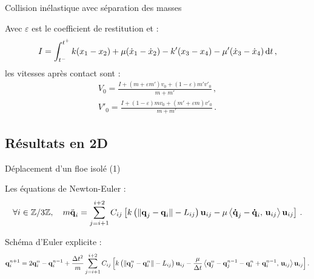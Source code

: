 \begin{frame}{Collision inélastique avec séparation des masses}
{{            Avec $\varepsilon$ est le coefficient de restitution et :
            \scriptsize
            $$
            I = \int_{t^{-}}^{t^{+}} k(x_1 - x_2) + \mu (\dot x_1 - \dot x_2) - k'(x_3 - x_4) - \mu'(\dot x_3 - \dot x_4) \mathop{}\!\mathrm{d} t \,,
            $$
            \normalsize
            les vitesses après contact sont :
            \begin{align*}
                V_0 = \frac{I + (m+\varepsilon m')v_0 + (1-\varepsilon)m'v'_0}{m+m'}\,, \\
                V'_0 = \frac{I + (1-\varepsilon)mv_0 + (m'+\varepsilon m)v'_0}{m+m'}\,.
            \end{align*}

        }

    }
    
\end{frame}






\subsection{Résultats en 2D}


\begin{frame}{Déplacement d'un floe isolé (1)}


    Les équations de Newton-Euler :
    \begin{align*}
        \forall i \in \mathbb{Z}/3\mathbb{Z}, \quad m \ddot{\bm{\mathrm{q}}}_i = \sum_{j=i+1}^{i+2}C_{ij} \left[  k \left( \Vert \bm{\mathrm{q}}_j - \bm{\mathrm{q}}_i \Vert - L_{ij} \right) \bm{\mathrm{u}}_{ij} - \mu \left\langle \bm{\mathrm{\dot{q}}}_j - \bm{\mathrm{\dot{q}}}_i, \, \bm{\mathrm{u}}_{ij}  \right\rangle  \bm{\mathrm{u}}_{ij}  \right] \,. 
    \end{align*}

    Schéma d’Euler explicite :
    \begin{align*} \label{eq:systeme2D}
        \bm{\mathrm{q}}_{i}^{n+1} = 2\bm{\mathrm{q}}_{i}^{n}-\bm{\mathrm{q}}_{i}^{n-1} + \frac{\Delta t^2}{m} \sum_{j=i+1}^{i+2}C_{ij}\left[ k \left( \Vert \bm{\mathrm{q}}_j^n - \bm{\mathrm{q}}_i^n \Vert - L_{ij} \right) \bm{\mathrm{u}}_{ij} - \frac{\mu}{\Delta t} \left\langle \bm{\mathrm{q}}_{j}^{n}-\bm{\mathrm{q}}_{j}^{n-1} - \bm{\mathrm{q}}_{i}^{n}+\bm{\mathrm{q}}_{i}^{n-1}, \, \bm{\mathrm{u}}_{ij} \right\rangle  \bm{\mathrm{u}}_{ij}  \right].
    \end{align*}
    
\end{frame}


